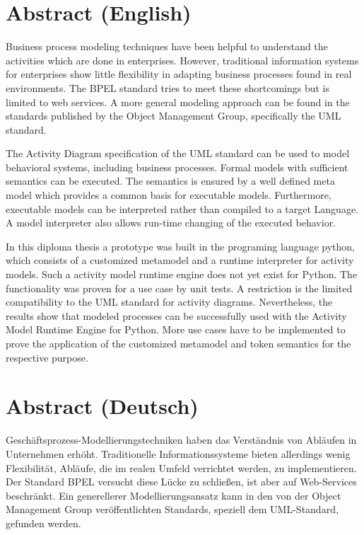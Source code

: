 
\section*{Abstract (English)}
Business process modeling techniques have been helpful to understand the activities which are done in enterprises. However, traditional information systems for enterprises show little flexibility in adapting business processes found in real environments. The BPEL standard tries to meet these shortcomings but is limited to web services. A more general modeling approach can be found in the standards published by the Object Management Group, specifically the UML standard.

The Activity Diagram specification of the UML standard can be used to model behavioral systems, including business processes. Formal models with sufficient semantics can be executed. The semantics is ensured by a well defined meta model which provides a common basis for executable models. Furthermore, executable models can be interpreted rather than compiled to a target Language. A model interpreter also allows run-time changing of the executed behavior.

In this diploma thesis a prototype was built in the programing language python, which consists of a customized metamodel and a runtime interpreter for activity models. Such a activity model runtime engine does not yet exist for Python. The functionality was proven for a use case by unit tests. A restriction is the limited compatibility to the UML standard for activity diagrams. Nevertheless, the results show that modeled processes can be successfully used with the Activity Model Runtime Engine for Python. More use cases have to be implemented to prove the application of the customized metamodel and token semantics for the respective purpose.

\newpage

\section*{Abstract (Deutsch)}
Geschäftsprozess-Modellierungstechniken haben das Verständnis von Ab\-läu\-fen in Unternehmen erhöht. Traditionelle Informationssysteme bieten allerdings wenig Flexibilität, Abläufe, die im realen Umfeld verrichtet werden, zu implementieren. Der Standard BPEL versucht diese Lücke zu schließen, ist aber auf Web-Services beschränkt. Ein generellerer Modellierungsansatz kann in den von der Object Management Group veröffentlichten Standards, speziell dem UML-Standard, gefunden werden.

